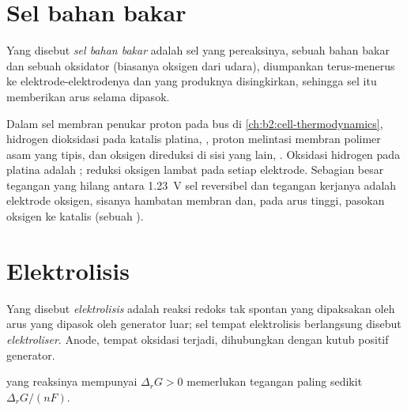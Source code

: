 \section{Sel bahan bakar}

\begin{definition}\label{def:b2:batteries-electrolysis:fuel-cell}
Yang disebut \emph{sel bahan bakar} adalah sel yang
pereaksinya, sebuah bahan bakar dan sebuah oksidator (biasanya oksigen
dari udara), diumpankan terus-menerus ke elektrode-elektrodenya dan yang
produknya disingkirkan, sehingga sel itu memberikan arus selama dipasok.
\end{definition}

Dalam sel membran penukar proton pada bus di
\cref{ch:b2:cell-thermodynamics}, hidrogen dioksidasi pada katalis platina,
, proton melintasi membran polimer asam yang tipis, dan
oksigen direduksi di sisi yang lain, . Oksidasi
hidrogen pada platina adalah ; reduksi oksigen lambat pada
setiap elektrode. Sebagian besar tegangan yang hilang antara \qty{1.23}{V}
sel reversibel dan tegangan kerjanya adalah  elektrode
oksigen, sisanya hambatan membran dan, pada arus tinggi, pasokan oksigen ke
katalis (sebuah ).

\section{Elektrolisis}

\begin{definition}[Elektrolisis]\label{def:b2:batteries-electrolysis:electrolysis}
Yang disebut \emph{elektrolisis} adalah reaksi redoks
tak spontan yang dipaksakan oleh arus yang dipasok oleh generator luar; sel
tempat elektrolisis berlangsung disebut
\emph{elektroliser}. Anode, tempat oksidasi terjadi,
dihubungkan dengan kutub positif generator.
\end{definition}

\begin{proposition}\label{prop:b2:batteries-electrolysis:minimum-voltage}
 yang reaksinya mempunyai $\Delta_r G > 0$ memerlukan
tegangan paling sedikit $\Delta_r G/(nF)$.
\end{proposition}

